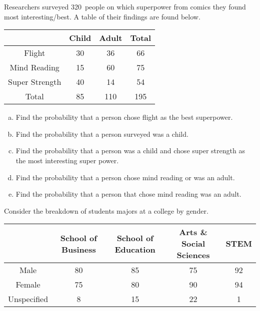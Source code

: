 \documentclass[11pt,letterpaper]{article}
\begin{document}

 Researchers surveyed 320~people on which superpower from comics they found most interesting/best. A table of their findings are found below.
	\begin{table}[!ht]
	\centering
	\begin{tabular}{|c|c|c|c|} \hline
	& Child & Adult & Total \\ \hline
	Flight & 30 & 36 & 66 \\ \hline
	Mind Reading & 15 & 60 & 75 \\ \hline
	Super Strength & 40 & 14 & 54 \\ \hline
	Total & 85 & 110 & 195 \\ \hline
	\end{tabular}
	\end{table}

\begin{enumerate}[(a)]
\item Find the probability that a person chose flight as the best superpower.
\item Find the probability that a person surveyed was a child.
\item Find the probability that a person was a child and chose super strength as the most interesting super power.
\item Find the probability that a person chose mind reading or was an adult.
\item Find the probability that a person that chose mind reading was an adult. 
\end{enumerate}


\newpage



 Consider the breakdown of students majors at a college by gender.
	\begin{table}[!ht]
	\centering
	\begin{tabular}{|c||c|c|c|c|} \hline
	& School of Business & School of Education & Arts \& Social Sciences & STEM \\ \hline \hline
	Male & 80 & 85 & 75 & 92 \\ \hline
	Female & 75 & 80 & 90 & 94 \\ \hline
	Unspecified & 8 & 15 & 22 & 1 \\ \hline
	\end{tabular}
	\end{table}
\end{document}
